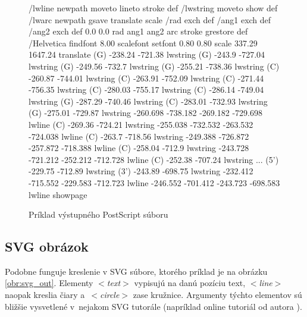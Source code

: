 \begin{figure}
\begin{code}[fontsize=\scriptsize, frame=none, samepage=true]
/lwline {newpath moveto lineto stroke} def
/lwstring {moveto show} def
/lwarc {newpath gsave translate scale /rad exch def /ang1 exch def
  /ang2 exch def 0.0 0.0 rad ang1 ang2 arc stroke grestore} def
/Helvetica findfont 8.00 scalefont setfont
0.80 0.80 scale
337.29 1647.24 translate
(G)            -238.24        -721.38        lwstring       
(G)            -243.9         -727.04        lwstring       
(G)            -249.56        -732.7         lwstring       
(G)            -255.21        -738.36        lwstring       
(C)            -260.87        -744.01        lwstring       
(C)            -263.91        -752.09        lwstring       
(C)            -271.44        -756.35        lwstring       
(C)            -280.03        -755.17        lwstring       
(C)            -286.14        -749.04        lwstring       
(G)            -287.29        -740.46        lwstring       
(C)            -283.01        -732.93        lwstring       
(G)            -275.01        -729.87        lwstring       
-260.698       -738.182       -269.182       -729.698        lwline
(C)            -269.36        -724.21        lwstring       
-255.038       -732.532       -263.532       -724.038        lwline
(C)            -263.7         -718.56        lwstring       
-249.388       -726.872       -257.872       -718.388        lwline
(C)            -258.04        -712.9         lwstring       
-243.728       -721.212       -252.212       -712.728        lwline
(C)            -252.38        -707.24        lwstring       
  ...
(5')           -229.75        -712.89        lwstring
(3')           -243.89        -698.75        lwstring
-232.412       -715.552       -229.583       -712.723        lwline
-246.552       -701.412       -243.723       -698.583        lwline
showpage
\end{code}
\caption{Príklad výstupného PostScript súboru}
\label{obr:ps_out}
\end{figure}



\newcommand{\tagt}[1]{\mbox{$<$\textit{#1}$>$}}

\subsection{SVG obrázok}

Podobne funguje kreslenie v SVG súbore, ktorého príklad je na obrázku \ref{obr:svg_out}.
Elementy \tagt{text} vypisujú na danú pozíciu text, \tagt{line}
naopak kreslia čiary a~\tagt{circle} zase kružnice.
Argumenty týchto elementov sú bližšie vysvetlené v~nejakom SVG tutorále
(napríklad online tutoriál od autora \citet{SVG_TUTORIAL}).


